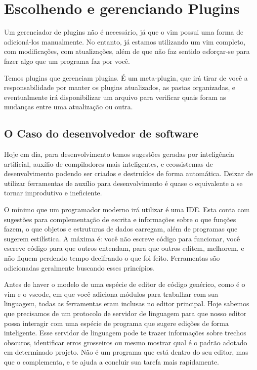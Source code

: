 \chapter{Escolhendo e gerenciando Plugins}
Um gerenciador de plugins não é necessário, já que o vim possui uma forma de adicioná-los manualmente.
No entanto, já estamos utilizando um vim completo, com modificações, com atualizações,
além de que não faz sentido esforçar-se para fazer algo que um programa faz por você.

Temos plugins que gerenciam plugins.
É um meta-plugin, que irá tirar de você a responsabilidade por manter os plugins atualizados,
as pastas organizadas, e eventualmente irá disponibilizar um arquivo para verificar quais foram
as mudanças entre uma atualização ou outra.

\section{O Caso do desenvolvedor de software}
Hoje em dia, para desenvolvimento temos sugestões geradas por inteligência artificial,
auxílio de compiladores mais inteligentes,
e ecossistemas de desenvolvimento podendo ser criados e destruídos de forma automática.
Deixar de utilizar ferramentas de auxílio para desenvolvimento é quase o equivalente a se tornar
improdutivo e ineficiente.

O mínimo que um programador moderno irá utilizar é uma IDE. Esta conta com sugestões para complementação
de escrita e informações sobre o que funções fazem, o que objetos e estruturas de dados carregam, além
de programas que sugerem estilística.
A máxima é: você não escreve código para funcionar, você escreve código para que outros entendam,
para que outros editem, melhorem, e não fiquem perdendo tempo decifrando o que foi feito.
Ferramentas são adicionadas geralmente buscando esses princípios.

Antes de haver o modelo de uma espécie de editor de código genérico, como é o vim e o vscode,
em que você adiciona módulos para trabalhar com sua linguagem, todas as ferramentas eram
inclusas no editor principal.
Hoje sabemos que precisamos de um protocolo de servidor de linguagem 
para que nosso editor possa
interagir com uma espécie de programa que sugere edições de forma inteligente.
Esse servidor de linguagem pode te trazer informações sobre trechos obscuros, identificar erros grosseiros
ou mesmo mostrar qual é o padrão adotado em determinado projeto.
Não é um programa que está dentro do seu editor, mas que o complementa,
e te ajuda a concluir sua tarefa mais rapidamente.

